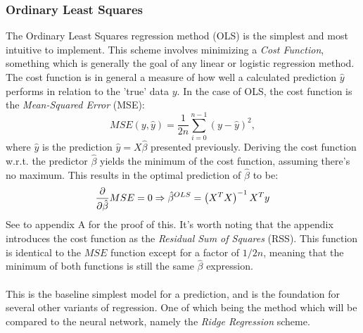         \subsubsection{Ordinary Least Squares}
            The Ordinary Least Squares regression method (OLS) is the simplest and most intuitive to implement. This scheme involves minimizing a \textit{Cost Function}, something which is generally the goal of any linear or logistic regression method. The cost function is in general a measure of how well a calculated prediction $\hat{y}$ performs in relation to the 'true' data $y$. In the case of OLS, the cost function is the \textit{Mean-Squared Error} (MSE):
            \begin{equation}\label{eq:MSE}
                MSE(y, \hat{y})=\frac1{2n}\sum_{i=0}^{n-1} \left( y-\hat{y} \right)^2,
            \end{equation}
            where $\hat{y}$ is the prediction $\hat{y}=X\hat{\beta}$ presented previously. Deriving the cost function w.r.t. the predictor $\hat{\beta}$ yields the minimum of the cost function, assuming there's no maximum. This results in the optimal prediction of $\hat{\beta}$ to be:
            \begin{equation}
                \pdv{}{\hat{\beta}}MSE=0\Rightarrow \hat{\beta}^{OLS} = \left( X^TX \right)^{-1}X^Ty
            \end{equation}
            See to appendix A 
			for the proof of this. It's worth noting that the appendix introduces the cost function as the \textit{Residual Sum of Squares} (RSS). This function is identical to the $MSE$ function except for a factor of $1/2n$, meaning that the minimum of both functions is still the same $\hat{\beta}$ expression. \\\\
            This is the baseline simplest model for a prediction, and is the foundation for several other variants of regression. One of which being the method which will be compared to the neural network, namely the \textit{Ridge Regression} scheme.
            
